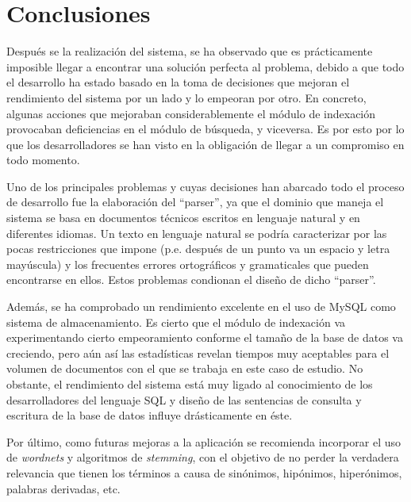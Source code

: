 \section{Conclusiones}\label{conclusiones}

Después se la realización del sistema, se ha observado que es
prácticamente imposible llegar a encontrar una solución perfecta al
problema, debido a que todo el desarrollo ha estado basado en la toma
de decisiones que mejoran el rendimiento del sistema por un lado y lo
empeoran por otro. En concreto, algunas acciones que mejoraban
considerablemente el módulo de indexación provocaban deficiencias en
el módulo de búsqueda, y viceversa. Es por esto por lo que los
desarrolladores se han visto en la obligación de llegar a un
compromiso en todo momento.

Uno de los principales problemas y cuyas decisiones han abarcado todo
el proceso de desarrollo fue la elaboración del ``parser'', ya que el
dominio que maneja el sistema se basa en documentos técnicos escritos
en lenguaje natural y en diferentes idiomas. Un texto en lenguaje
natural se podría caracterizar por las pocas restricciones que impone
(p.e. después de un punto va un espacio y letra mayúscula) y los
frecuentes errores ortográficos y gramaticales que pueden encontrarse
en ellos. Estos problemas condionan el diseño de dicho ``parser''.

Además, se ha comprobado un rendimiento excelente en el uso de MySQL
como sistema de almacenamiento. Es cierto que el módulo de
indexación va experimentando cierto empeoramiento conforme el tamaño
de la base de datos va creciendo, pero aún así las estadísticas
revelan tiempos muy aceptables para el volumen de documentos con el
que se trabaja en este caso de estudio. No obstante, el rendimiento del
sistema está muy ligado al conocimiento de los desarrolladores del
lenguaje SQL y diseño de las sentencias de consulta y
escritura de la base de datos influye drásticamente en éste.

Por último, como futuras mejoras a la aplicación se recomienda
incorporar el uso de \emph{wordnets} y algoritmos de \emph{stemming},
con el objetivo de no perder la verdadera relevancia que tienen los
términos a causa de sinónimos, hipónimos, hiperónimos, palabras
derivadas, etc.